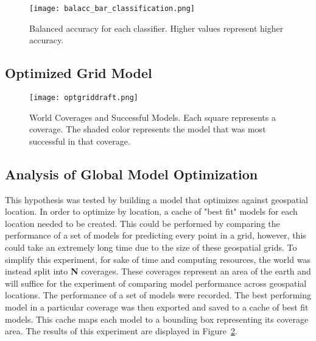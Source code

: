 \begin{figure}[htp]
    \centering
    \texttt{[image: balacc\_bar\_classification.png]}
    \caption{Balanced accuracy for each classifier. Higher values represent higher accuracy.}
    \label{fig:balacc_barplot_classification}
\end{figure}

\subsection{Optimized Grid Model}
\setlength{\parindent}{10ex}

\begin{figure}[htp]
    \centering
    \texttt{[image: optgriddraft.png]}
    \caption{World Coverages and Successful Models.
    Each square represents a coverage.
    The shaded color represents the model that was most successful in that coverage.}
    \label{fig:coveragegrid}
\end{figure}

\subsection{Analysis of Global Model Optimization}
This hypothesis was tested by building a model that optimizes against geospatial location.
In order to optimize by location, a cache of "best fit" models for each location needed to be created.
This could be performed by comparing the performance of a set of models for predicting every point in a grid, however, this could take an extremely long time due to the size of these geospatial grids.
To simplify this experiment, for sake of time and computing resources, the world was instead split into \textbf{N} coverages.
These coverages represent an area of the earth and will suffice for the experiment of comparing model performance across geospatial locations.
The performance of a set of models were recorded.
The best performing model in a particular coverage was then exported and saved to a cache of best fit models.
This cache maps each model to a bounding box representing its coverage area.
The results of this experiment are displayed in Figure~\ref{fig:coveragegrid}.

